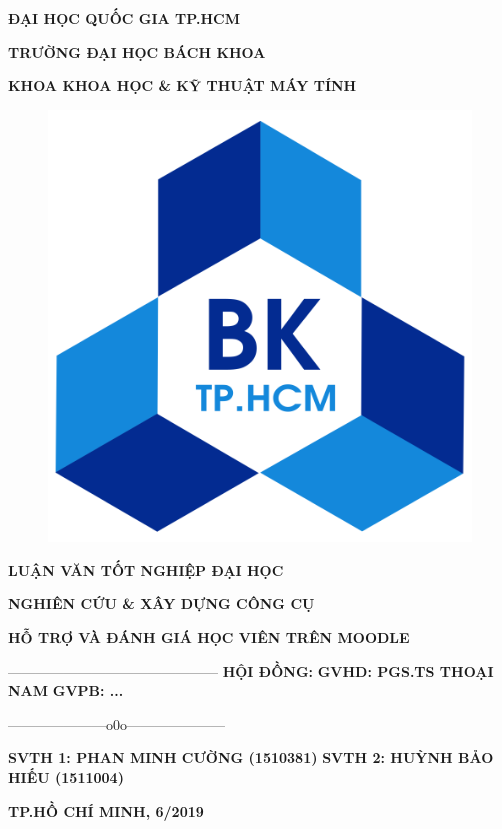 
\begin{titlepage}
\centerline{\fontsize{15}{15}\bf ĐẠI HỌC QUỐC GIA TP.HCM}
\centerline{\fontsize{15}{15}\bf TRƯỜNG ĐẠI HỌC BÁCH KHOA}
\centerline{\fontsize{15}{15}\bf KHOA KHOA HỌC \& KỸ THUẬT MÁY TÍNH}
\begin{center}
	\begin{figure}[htp]
		\begin{center}
			\includegraphics[scale=0.1]{img/logo}
		\end{center}
	\end{figure}
\end{center}
\centerline{\fontsize{15}{15}\bf LUẬN VĂN TỐT NGHIỆP ĐẠI HỌC}
\vspace*{2cm}
\centerline{\Large\bf NGHIÊN CỨU \& XÂY DỰNG CÔNG CỤ}
\vspace*{0.5cm}
\centerline{\Large\bf HỖ TRỢ VÀ ĐÁNH GIÁ HỌC VIÊN TRÊN MOODLE}
\vskip 0.5cm
\hskip 4.9cm {———————————————}
\vskip 1.5cm
\hskip3cm{\fontsize{15}{15}\bf HỘI ĐỒNG:}
\vskip 0.5cm
\hskip3cm{\fontsize{15}{15}\bf GVHD: PGS.TS THOẠI NAM}
\vskip 0.5cm
\hskip3cm{\fontsize{15}{15}\bf GVPB: ...}
\vskip 0.5cm
\centerline{———————o0o———————}
\vskip 0.5cm
\hskip3cm{\fontsize{15}{15}\bf SVTH 1: PHAN MINH CƯỜNG (1510381)}
\vskip 0.5cm
\hskip3cm{\fontsize{15}{15}\bf SVTH 2: HUỲNH BẢO HIẾU (1511004)}
\vfill
\centerline{\bf TP.HỒ CHÍ MINH, 6/2019}
\end{titlepage}